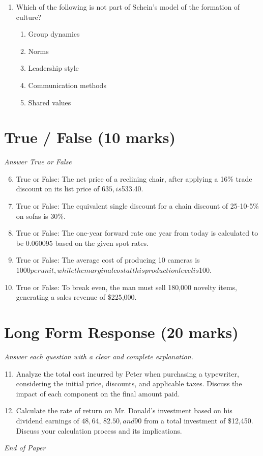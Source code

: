 \documentclass[12pt]{article}
\begin{document}
\begin{enumerate}[label=\arabic*.]
\begin{enumerate}[label=(\alph*)]
    \item Permissions.
    \item Social Media popularity.
    \item Website aesthetics.
    \item Digital literacy.
    \item Ownership.
\end{enumerate}
\item Which of the following is not part of Schein's model of the formation of culture?
\begin{enumerate}[label=(\alph*)]
    \item Group dynamics
    \item Norms
    \item Leadership style
    \item Communication methods
    \item Shared values
\end{enumerate}
\end{enumerate}

\section*{True / False (10 marks)}
\textit{Answer True or False}
\begin{enumerate}[label=\arabic*.]
\setcounter{enumi}{5}
\item True or False: The net price of a reclining chair, after applying a 16\% trade discount on its list price of $635, is $533.40.
\item True or False: The equivalent single discount for a chain discount of 25-10-5\% on sofas is 30\%.
\item True or False: The one-year forward rate one year from today is calculated to be 0.060095 based on the given spot rates.
\item True or False: The average cost of producing 10 cameras is $1000 per unit, while the marginal cost at this production level is $100.
\item True or False: To break even, the man must sell 180,000 novelty items, generating a sales revenue of \$225,000.
\end{enumerate}

\section*{Long Form Response (20 marks)}
\textit{Answer each question with a clear and complete explanation.}
\begin{enumerate}[label=\arabic*.]
\setcounter{enumi}{10}
\item Analyze the total cost incurred by Peter when purchasing a typewriter, considering the initial price, discounts, and applicable taxes. Discuss the impact of each component on the final amount paid.
\item Calculate the rate of return on Mr. Donald's investment based on his dividend earnings of $48, $64, $82.50, and $90 from a total investment of \$12,450. Discuss your calculation process and its implications.
\end{enumerate}

\vfill
\noindent\textit{End of Paper}
\end{document}
